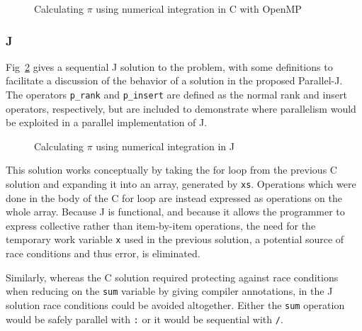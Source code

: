 \begin{figure}[h]
\begin{quote}
\begin{singlespacing}
\begin{small}
\end{small}
\end{singlespacing}
\end{quote}
\caption{Calculating $\pi$ using numerical integration in C with OpenMP}
\label{fig::num-int-par.c}
\end{figure}

\subsubsection{J}
Fig~\ref{fig::num-int-pi.ijs} gives a sequential J solution to the problem, 
with some definitions to facilitate a discussion 
of the behavior of a solution in the proposed Parallel-J. 
The operators \texttt{p\_rank} and \texttt{p\_insert}
are defined as the normal rank and insert operators, respectively,  
but are included to demonstrate where parallelism would be exploited in a parallel implementation of J.

\begin{figure}[h]
\begin{quote}
\begin{singlespacing}
\begin{small}
\end{small}
\end{singlespacing}
\end{quote}
\caption{Calculating $\pi$ using numerical integration in J}
\label{fig::num-int-pi.ijs}
\end{figure}

This solution works conceptually by taking the for loop from the previous C solution 
and expanding it into an array, generated by \texttt{xs}.
Operations which were done in the body of the C for loop 
are instead expressed as operations on the whole array. 
Because J is functional, and 
because it allows the programmer to express collective rather than item-by-item operations, 
the need for the temporary work variable \texttt{x} used in the previous solution, 
a potential source of race conditions and thus error, is eliminated. 

Similarly, whereas the C solution required 
protecting against race conditions when reducing on the \texttt{sum} variable
by giving compiler annotations, 
in the J solution race conditions could be avoided altogether.
Either the \texttt{sum} operation would be safely parallel with \texttt{\::} or 
it would be sequential with \texttt{/}.

